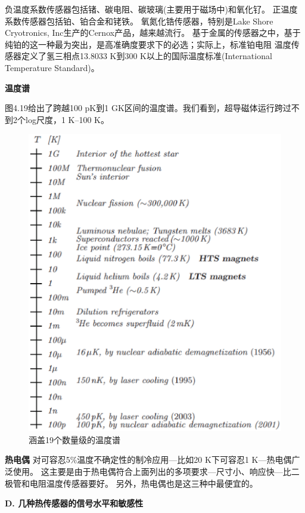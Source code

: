 负温度系数传感器包括锗、碳电阻、碳玻璃(主要用于磁场中)和氧化钌。
正温度系数传感器包括铂、铂合金和铑铁。
氧氮化锆传感器，特别是Lake Shore Cryotronics, Inc生产的Cernox产品，越来越流行。
基于金属的传感器之中，基于纯铂的这一种最为突出，是高准确度要求下的必选；实际上，标准铂电阻
温度传感器定义了氢三相点13.8033 K到300 K以上的国际温度标准(International Temperature Standard)。

\textbf{温度谱}

图4.19给出了跨越100 pK到1 GK区间的温度谱。我们看到，超导磁体运行跨过不到2个log尺度，1 K–100 K。

\begin{figure}[htbp]
	\centering
	\includegraphics[scale=0.7]{chpt4/figs/fig4.19.eps}
	\caption{涵盖19个数量级的温度谱}
\end{figure}

\textbf{热电偶} 对可容忍5\%温度不确定性的制冷应用---比如20 K下可容忍1 K---热电偶广泛使用。
这主要是由于热电偶符合上面列出的多项要求---尺寸小、响应快---比二极管和电阻温度传感器要好。
另外，热电偶也是这三种中最便宜的。

\textbf{D. 几种热传感器的信号水平和敏感性}

